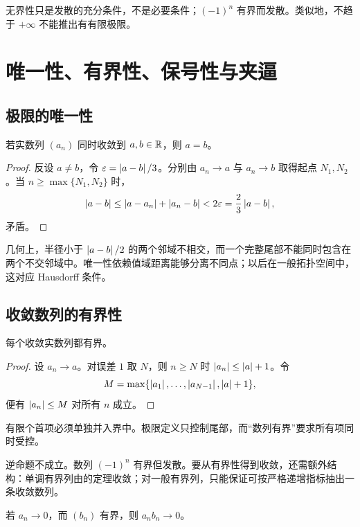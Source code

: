 无界性只是发散的充分条件，不是必要条件；\((-1)^n\) 有界而发散。类似地，不趋于 \(+\infty\) 不能推出有有限极限。

\section{唯一性、有界性、保号性与夹逼}

\subsection{极限的唯一性}

\begin{theorem}[极限唯一性]
若实数列 \((a_n)\) 同时收敛到 \(a,b\in\mathbb{R}\)，则 \(a=b\)。
\end{theorem}

\begin{proof}
反设 \(a\ne b\)，令 \(\varepsilon=\left|a-b\right|/3\)。分别由 \(a_n\to a\) 与 \(a_n\to b\) 取得起点 \(N_1,N_2\)。当 \(n\ge\max\{N_1,N_2\}\) 时，
\[
 \left|a-b\right|\le\left|a-a_n\right|+\left|a_n-b\right|
 <2\varepsilon=\frac23\left|a-b\right|,
\]
矛盾。
\end{proof}

几何上，半径小于 \(\left|a-b\right|/2\) 的两个邻域不相交，而一个完整尾部不能同时包含在两个不交邻域中。唯一性依赖值域距离能够分离不同点；以后在一般拓扑空间中，这对应 Hausdorff 条件。

\subsection{收敛数列的有界性}

\begin{theorem}
每个收敛实数列都有界。
\end{theorem}

\begin{proof}
设 \(a_n\to a\)。对误差 \(1\) 取 \(N\)，则 \(n\ge N\) 时
\(\left|a_n\right|\le\left|a\right|+1\)。令
\[
 M=\max\{\left|a_1\right|,\ldots,\left|a_{N-1}\right|,\left|a\right|+1\},
\]
便有 \(\left|a_n\right|\le M\) 对所有 \(n\) 成立。
\end{proof}

有限个首项必须单独并入界中。极限定义只控制尾部，而“数列有界”要求所有项同时受控。

逆命题不成立。数列 \((-1)^n\) 有界但发散。要从有界性得到收敛，还需额外结构：单调有界列由的定理收敛；对一般有界列，只能保证可按严格递增指标抽出一条收敛数列。

\begin{proposition}[零列乘有界列]
若 \(a_n\to0\)，而 \((b_n)\) 有界，则 \(a_nb_n\to0\)。
\end{proposition}

